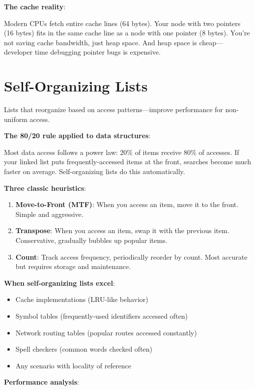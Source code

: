 \textbf{The cache reality}:

Modern CPUs fetch entire cache lines (64 bytes). Your node with two pointers (16 bytes) fits in the same cache line as a node with one pointer (8 bytes). You're not saving cache bandwidth, just heap space. And heap space is cheap—developer time debugging pointer bugs is expensive.

\section{Self-Organizing Lists}

Lists that reorganize based on access patterns—improve performance for non-uniform access.

\textbf{The 80/20 rule applied to data structures}:

Most data access follows a power law: 20\% of items receive 80\% of accesses. If your linked list puts frequently-accessed items at the front, searches become much faster on average. Self-organizing lists do this automatically.

\textbf{Three classic heuristics}:

\begin{enumerate}
    \item \textbf{Move-to-Front (MTF)}: When you access an item, move it to the front. Simple and aggressive.
    \item \textbf{Transpose}: When you access an item, swap it with the previous item. Conservative, gradually bubbles up popular items.
    \item \textbf{Count}: Track access frequency, periodically reorder by count. Most accurate but requires storage and maintenance.
\end{enumerate}

\textbf{When self-organizing lists excel}:
\begin{itemize}
    \item Cache implementations (LRU-like behavior)
    \item Symbol tables (frequently-used identifiers accessed often)
    \item Network routing tables (popular routes accessed constantly)
    \item Spell checkers (common words checked often)
    \item Any scenario with locality of reference
\end{itemize}

\textbf{Performance analysis}:

